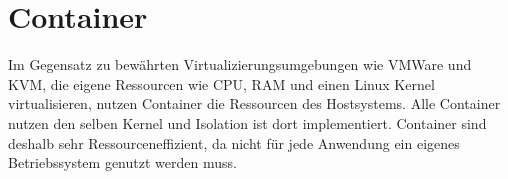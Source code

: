 \section{Container}

Im Gegensatz zu bewährten Virtualizierungsumgebungen wie VMWare und KVM, die eigene Ressourcen wie CPU, RAM und 
einen Linux Kernel virtualisieren, nutzen Container die Ressourcen des Hostsystems. Alle Container nutzen den selben Kernel 
und Isolation ist dort implementiert. Container sind deshalb sehr Ressourceneffizient, da nicht für jede Anwendung ein eigenes
Betriebssystem genutzt werden muss. \cite{Kane2018}

\begin{figure}
  \
\end{figure}